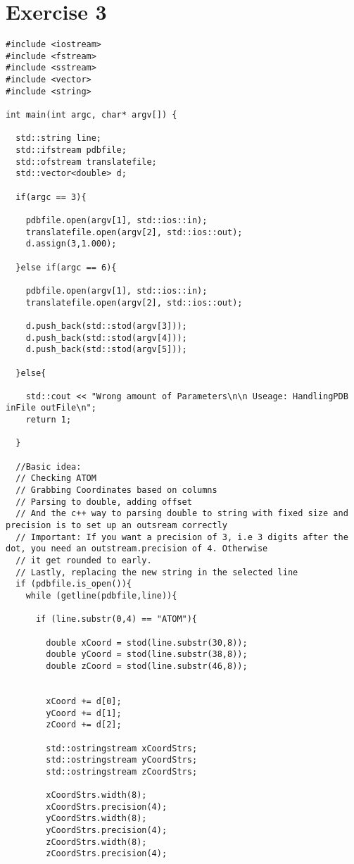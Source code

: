 \documentclass[11pt]{article}
\begin{document}
\section{Exercise 3}

\begin{lstlisting}
#include <iostream>
#include <fstream>
#include <sstream>
#include <vector>
#include <string>

int main(int argc, char* argv[]) {

  std::string line;
  std::ifstream pdbfile;
  std::ofstream translatefile;
  std::vector<double> d;

  if(argc == 3){

    pdbfile.open(argv[1], std::ios::in);
    translatefile.open(argv[2], std::ios::out);
    d.assign(3,1.000);

  }else if(argc == 6){

    pdbfile.open(argv[1], std::ios::in);
    translatefile.open(argv[2], std::ios::out);
  
    d.push_back(std::stod(argv[3]));
    d.push_back(std::stod(argv[4]));
    d.push_back(std::stod(argv[5]));

  }else{

    std::cout << "Wrong amount of Parameters\n\n Useage: HandlingPDB inFile outFile\n";
    return 1;

  }

  //Basic idea:
  // Checking ATOM
  // Grabbing Coordinates based on columns
  // Parsing to double, adding offset
  // And the c++ way to parsing double to string with fixed size and precision is to set up an outsream correctly
  // Important: If you want a precision of 3, i.e 3 digits after the dot, you need an outstream.precision of 4. Otherwise
  // it get rounded to early.
  // Lastly, replacing the new string in the selected line
  if (pdbfile.is_open()){
    while (getline(pdbfile,line)){
      
      if (line.substr(0,4) == "ATOM"){

        double xCoord = stod(line.substr(30,8));
        double yCoord = stod(line.substr(38,8));
        double zCoord = stod(line.substr(46,8));


        xCoord += d[0];
        yCoord += d[1];
        zCoord += d[2];

        std::ostringstream xCoordStrs;
        std::ostringstream yCoordStrs;
        std::ostringstream zCoordStrs;

        xCoordStrs.width(8);
        xCoordStrs.precision(4);
        yCoordStrs.width(8);
        yCoordStrs.precision(4);
        zCoordStrs.width(8);
        zCoordStrs.precision(4);


\end{lstlisting}
\end{document}
